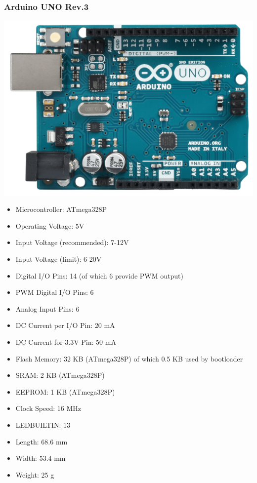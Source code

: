 \documentclass[12pt,a4paper,portrait]{article}
\begin{document}
			\subsubsection{Arduino UNO Rev.3}
				\begin{center}
					\includegraphics[scale=0.07]{./img/arduino_uno.png}
				\end{center}
			\cite{arduinoCompany}
			\begin{itemize}
				\item Microcontroller: ATmega328P
				\item Operating Voltage: 5V
				\item Input Voltage (recommended): 7-12V
				\item Input Voltage (limit): 6-20V
				\item Digital I/O Pins: 14 (of which 6 provide PWM output)
				\item PWM Digital I/O Pins: 6
				\item Analog Input Pins: 6
				\item DC Current per I/O Pin: 20 mA
				\item DC Current for 3.3V Pin: 50 mA
				\item Flash Memory: 32 KB (ATmega328P) of which 0.5 KB used by bootloader
				\item SRAM: 2 KB (ATmega328P)
				\item EEPROM: 1 KB (ATmega328P)
				\item Clock Speed: 16 MHz
				\item LED\textunderscore BUILTIN: 13
				\item Length: 68.6 mm
				\item Width: 53.4 mm
				\item Weight: 25 g
			\end{itemize}
\end{document}
